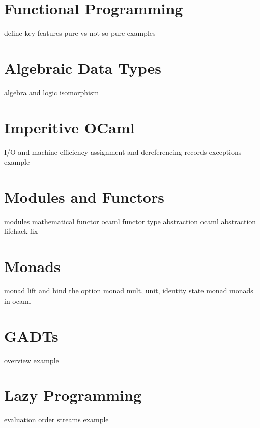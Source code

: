 \section{Functional Programming}
define
key features
pure vs not so pure
examples

\section{Algebraic Data Types}
algebra and logic
isomorphism

\section{Imperitive OCaml}
I/O and machine efficiency
assignment and dereferencing
records
exceptions
example

\section{Modules and Functors}
modules
mathematical functor
ocaml functor
type abstraction
ocaml abstraction lifehack fix

\section{Monads}
monad
lift and bind
the option monad
mult, unit, identity
state monad
monads in ocaml
 
\section{GADTs}
overview
example

\section{Lazy Programming}
evaluation order
streams
example
